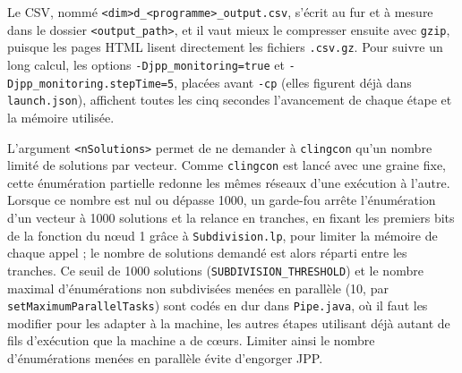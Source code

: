 Le CSV, nommé \texttt{<dim>d\_<programme>\_output.csv}, s'écrit au fur et à mesure dans le dossier \texttt{<output\_path>}, et il vaut mieux le compresser ensuite avec \texttt{gzip}, puisque les pages HTML lisent directement les fichiers \texttt{.csv.gz}.
Pour suivre un long calcul, les options \texttt{-Djpp\_monitoring=true} et \texttt{-Djpp\_monitoring.stepTime=5}, placées avant \texttt{-cp} (elles figurent déjà dans \texttt{launch.json}), affichent toutes les cinq secondes l'avancement de chaque étape et la mémoire utilisée.

L'argument \texttt{<nSolutions>} permet de ne demander à \texttt{clingcon} qu'un nombre limité de solutions par vecteur.
Comme \texttt{clingcon} est lancé avec une graine fixe, cette énumération partielle redonne les mêmes réseaux d'une exécution à l'autre.
Lorsque ce nombre est nul ou dépasse 1000, un garde-fou arrête l'énumération d'un vecteur à 1000 solutions et la relance en tranches, en fixant les premiers bits de la fonction du nœud 1 grâce à \texttt{Subdivision.lp}, pour limiter la mémoire de chaque appel ; le nombre de solutions demandé est alors réparti entre les tranches.
Ce seuil de 1000 solutions (\texttt{SUBDIVISION\_THRESHOLD}) et le nombre maximal d'énumérations non subdivisées menées en parallèle (10, par \texttt{setMaximumParallelTasks}) sont codés en dur dans \texttt{Pipe.java}, où il faut les modifier pour les adapter à la machine, les autres étapes utilisant déjà autant de fils d'exécution que la machine a de cœurs.
Limiter ainsi le nombre d'énumérations menées en parallèle évite d'engorger JPP.

